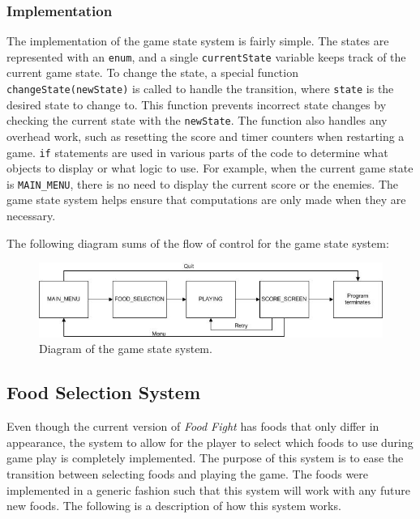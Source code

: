 \documentclass{article}
\begin{document}
\subsubsection{Implementation}
The implementation of the game state system is fairly simple. The states are represented with an \verb+enum+, and a single \verb+currentState+ variable keeps track of the current game state. To change the state, a special function \verb+changeState(newState)+ is called to handle the transition, where \verb+state+ is the desired state to change to. This function prevents incorrect state changes by checking the current state with the \verb+newState+. The function also handles any overhead work, such as resetting the score and timer counters when restarting a game. \verb+if+ statements are used in various parts of the code to determine what objects to display or what logic to use. For example, when the current game state is \verb+MAIN_MENU+, there is no need to display the current score or the enemies. The game state system helps ensure that computations are only made when they are necessary.

The following diagram sums of the flow of control for the game state system:

\begin{figure}[H]
    \centering
    \includegraphics{gamestate}
    \caption{Diagram of the game state system.}
\end{figure}

\subsection{Food Selection System}
Even though the current version of \textit{Food Fight} has foods that only differ in appearance, the system to allow for the player to select which foods to use during game play is completely implemented. The purpose of this system is to ease the transition between selecting foods and playing the game. The foods were implemented in a generic fashion such that this system will work with any future new foods. The following is a description of how this system works.
\end{document}
